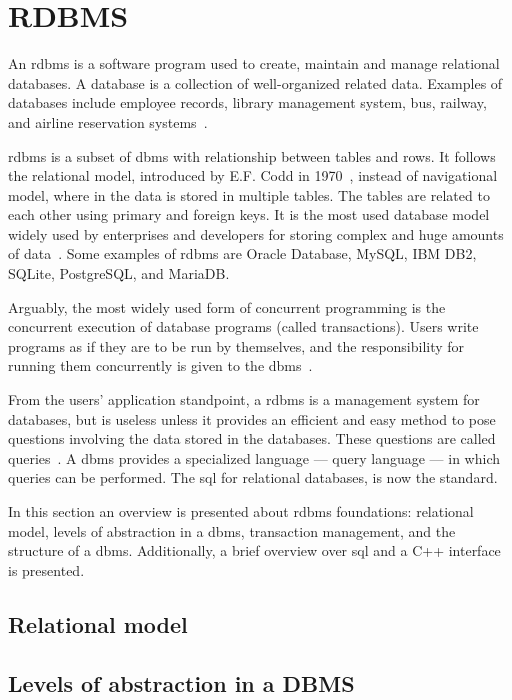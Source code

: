 %
\section{RDBMS}
\label{sec:rdbms}
An \acrfull{rdbms} is a software program used to create, maintain and manage
relational databases.
A database is a collection of well-organized related data. Examples of databases
include employee records, library management system, bus, railway, and airline
reservation systems~\cite{rdbmsDbmsDiff}.

\gls{rdbms} is a subset of \gls{dbms} with relationship between tables
and rows. It follows the relational model, introduced by E.F. Codd in 1970~\cite{ramakrishnan2003database},
instead of navigational model, where in the data is stored in multiple tables.
The tables are related to each other
using primary and foreign keys. It is the most used database model widely used
by enterprises and developers for storing complex and huge amounts of
data~\cite{rdbmsDbmsDiff}. Some examples of \gls{rdbms} are Oracle Database,
MySQL, IBM DB2, SQLite, PostgreSQL, and MariaDB.

Arguably, the most widely used form
of concurrent programming is the concurrent execution of database programs
(called transactions). Users write programs as if they are to be run by
themselves, and the responsibility for running them concurrently is given to the
\gls{dbms}~\cite{ramakrishnan2003database}.

From the users' application standpoint, a \gls{rdbms} is a management system
for databases, but is useless unless it provides an efficient and easy method to
pose questions involving the data stored in the databases. These questions are
called queries~\cite{ramakrishnan2003database}. A \gls{dbms} provides a
specialized language --- query language --- in which queries can be performed.
The \gls{sql} for relational databases, is now the standard.

In this section an overview is presented about \gls{rdbms} foundations:
relational model, levels of abstraction in a \gls{dbms}, transaction management,
and the structure of a \gls{dbms}. Additionally, a brief overview over \gls{sql}
and a C++ interface is presented.

\subsection{Relational model}
\label{sec:relational-model}

\subsection{Levels of abstraction in a DBMS}
\label{sec:levels-abstr-dbms}


